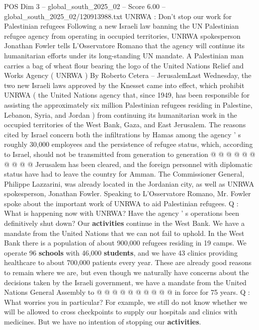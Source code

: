 \begin{textsample}{POS Dim 3 – global\_south\_2025\_02 – Score 6.00 – global\_south\_2025\_02/120913988.txt}  \label{ex:f3_pos_416}
UNRWA : Don't stop our work for Palestinian refugees Following a new Israeli law banning the UN Palestinian refugee agency from operating in occupied territories, UNRWA spokesperson Jonathan Fowler tells L'Osservatore Romano that the agency will continue its humanitarian efforts under its long-standing UN mandate.
A Palestinian man carries a bag of wheat flour bearing the logo of the United Nations Relief and Works Agency ( UNRWA ) By Roberto Cetera -- JerusalemLast Wednesday, the two new Israeli laws approved by the Knesset came into effect, which prohibit UNRWA ( the United Nations agency that, since 1949, has been responsible for assisting the approximately six million Palestinian refugees residing in Palestine, Lebanon, Syria, and Jordan ) from continuing its humanitarian work in the occupied territories of the West Bank, Gaza, and East Jerusalem.
The reasons cited by Israel concern both the infiltrations by Hamas among the agency ' s roughly 30,000 employees and the persistence of refugee status, which, according to Israel, should not be transmitted from generation to generation @ @ @ @ @ @ @ @ @ @ Jerusalem has been cleared, and the foreign personnel with diplomatic status have had to leave the country for Amman.
The Commissioner General, Philippe Lazzarini, was already located in the Jordanian city, as well as UNRWA spokesperson, Jonathan Fowler.
Speaking to L'Osservatore Romano, Mr.
Fowler spoke about the important work of UNRWA to aid Palestinian refugees.
Q : What is happening now with UNRWA?
Have the agency ' s operations been definitively shut down?
Our \textbf{activities} continue in the West Bank.
We have a mandate from the United Nations that we can not fail to uphold.
In the West Bank there is a population of about 900,000 refugees residing in 19 camps.
We operate 96 \textbf{schools} with 46,000 \textbf{students}, and we have 43 clinics providing healthcare to about 700,000 patients every year.
These are already good reasons to remain where we are, but even though we naturally have concerns about the decisions taken by the Israeli government, we have a mandate from the United Nations General Assembly to @ @ @ @ @ @ @ @ @ @ in force for 75 years.
Q : What worries you in particular?
For example, we still do not know whether we will be allowed to cross checkpoints to supply our hospitals and clinics with medicines.
But we have no intention of stopping our \textbf{activities}.

\end{textsample}
